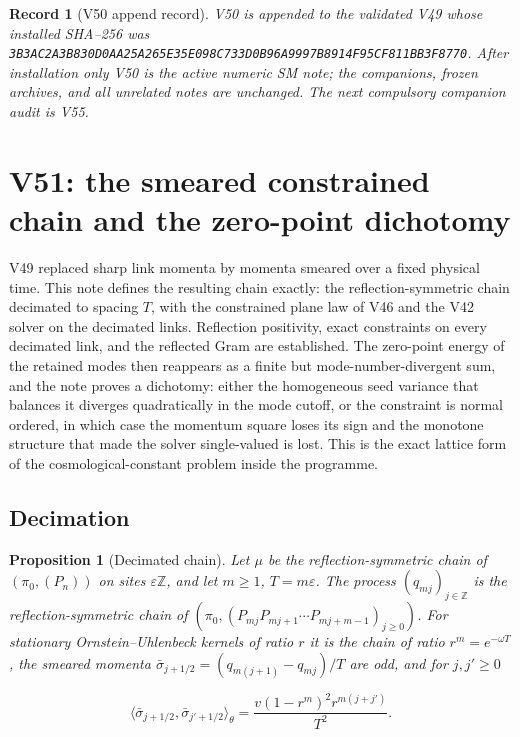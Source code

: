 \documentclass[11pt]{article}
\newtheorem{proposition}[theorem]{Proposition}
\newtheorem{record}[theorem]{Record}
\theoremstyle{remark}
\begin{document}
\begin{record}[V50 append record]
\label{rec:v19v50}
V50 is appended to the validated V49 whose installed SHA--256 was
\texttt{3B3AC2A3B830D0AA25A265E35E098C733D0B96A9997B8914F95CF811BB3F8770}.
After installation only V50 is the active numeric SM note; the
companions, frozen archives, and all unrelated notes are unchanged.  The
next compulsory companion audit is V55.
\end{record}


\section{V51: the smeared constrained chain and the zero-point dichotomy}
\label{sec:v19v51}

V49 replaced sharp link momenta by momenta smeared over a fixed
physical time.  This note defines the resulting chain exactly: the
reflection-symmetric chain decimated to spacing \(T\), with the
constrained plane law of V46 and the V42 solver on the decimated links.
Reflection positivity, exact constraints on every decimated link, and
the reflected Gram are established.  The zero-point energy of the
retained modes then reappears as a finite but mode-number-divergent sum,
and the note proves a dichotomy: either the homogeneous seed variance
that balances it diverges quadratically in the mode cutoff, or the
constraint is normal ordered, in which case the momentum square loses
its sign and the monotone structure that made the solver single-valued
is lost.  This is the exact lattice form of the cosmological-constant
problem inside the programme.

\subsection{Decimation}

\begin{proposition}[Decimated chain]
\label{prop:v19v51-decimation}
Let \(\mu\) be the reflection-symmetric chain of \((\pi_0,(P_n))\) on
sites \(\varepsilon\mathbb Z\), and let \(m\geq1\), \(T=m\varepsilon\).
The process \((q_{mj})_{j\in\mathbb Z}\) is the reflection-symmetric
chain of \((\pi_0,(P_{mj}P_{mj+1}\cdots P_{mj+m-1})_{j\geq0})\).  For
stationary Ornstein--Uhlenbeck kernels of ratio \(r\) it is the chain
of ratio \(r^m=e^{-\omega T}\), the smeared momenta
\(\bar\sigma_{j+1/2}=(q_{m(j+1)}-q_{mj})/T\) are odd, and for
\(j,j'\geq0\)

\[
 \langle\bar\sigma_{j+1/2},\bar\sigma_{j'+1/2}\rangle_\theta
 =\frac{v(1-r^m)^2r^{m(j+j')}}{T^2}.                                   \tag{54.1}
\]
\end{proposition}
\end{document}
